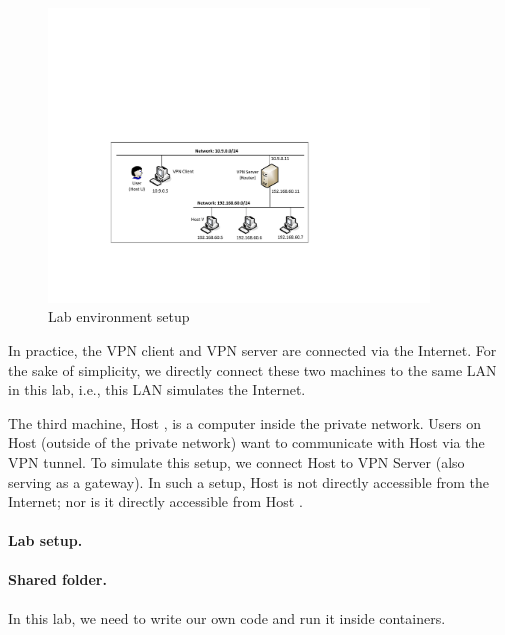 \begin{figure}[htb]
\begin{center}
\includegraphics[width=0.9\textwidth]{./Figs/VPN_2lans.pdf}
\end{center}
\caption{Lab environment setup}
\label{vpn:fig:labsetup}
\end{figure}
 

In practice, the VPN client and VPN server are connected via the Internet.
For the sake of simplicity, we directly connect these two
machines to the same LAN in this lab, i.e., this LAN simulates the Internet. 

The third machine, Host \hostv, is a computer inside the private network. Users
on Host \hostu (outside of the private network) want to communicate with Host \hostv 
via the VPN tunnel. To simulate this setup, we connect Host \hostv to VPN Server
(also serving as a gateway).  In such a setup, 
Host \hostv is not directly accessible from the Internet; nor is it directly accessible 
from Host \hostu. 



\paragraph{Lab setup.} 


\paragraph{Shared folder.} 
In this lab, we need to write our own code and 
run it inside containers.  


